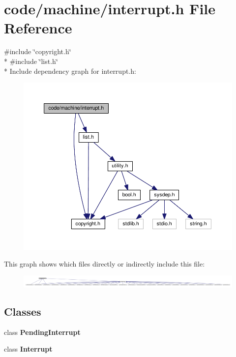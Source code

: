\section{code/machine/interrupt.h File Reference}
\label{interrupt_8h}
{\ttfamily \#include \char`\"{}copyright.\+h\char`\"{}}\\*
{\ttfamily \#include \char`\"{}list.\+h\char`\"{}}\\*
Include dependency graph for interrupt.\+h\+:
\nopagebreak
\begin{figure}[H]
\begin{center}
\leavevmode
\includegraphics[width=350pt]{interrupt_8h__incl}
\end{center}
\end{figure}
This graph shows which files directly or indirectly include this file\+:
\nopagebreak
\begin{figure}[H]
\begin{center}
\leavevmode
\includegraphics[width=350pt]{interrupt_8h__dep__incl}
\end{center}
\end{figure}
\subsection*{Classes}
\begin{DoxyCompactItemize}
\item 
class {\bf Pending\+Interrupt}
\item 
class {\bf Interrupt}
\end{DoxyCompactItemize}
